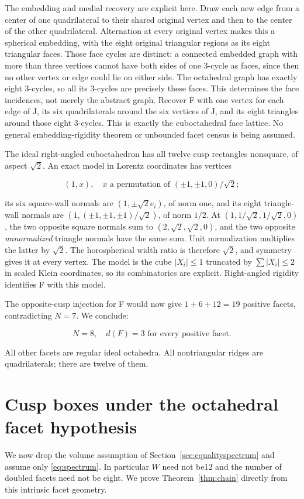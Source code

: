 \documentclass[11pt]{article}
\theoremstyle{remark}
\begin{document}
The embedding and medial recovery are explicit here. Draw each new edge from a center of one quadrilateral to their shared original vertex and then to the center of the other quadrilateral. Alternation at every original vertex makes this a spherical embedding, with the eight original triangular regions as its eight triangular faces. Those face cycles are distinct: a connected embedded graph with more than three vertices cannot have both sides of one $3$-cycle as faces, since then no other vertex or edge could lie on either side. The octahedral graph has exactly eight 3-cycles, so all its 3-cycles are precisely these faces. This determines the face incidences, not merely the abstract graph. Recover F with one vertex for each edge of J, its six quadrilaterals around the six vertices of J, and its eight triangles around those eight 3-cycles. This is exactly the cuboctahedral face lattice. No general embedding-rigidity theorem or unbounded facet census is being assumed.

The ideal right-angled cuboctahedron has all twelve cusp rectangles nonsquare, of aspect \(\sqrt2\). An exact model in Lorentz coordinates has vertices

\[
 (1,x),\quad x\text{ a permutation of }(\pm1,\pm1,0)/\sqrt2;
\]

its six square-wall normals are \((1,\pm\sqrt2 e_i)\), of norm one, and its eight triangle-wall normals are \((1,(\pm1,\pm1,\pm1)/\sqrt2)\), of norm \(1/2\). At \((1,1/\sqrt2,1/\sqrt2,0)\), the two opposite square normals sum to \((2,\sqrt2,\sqrt2,0)\), and the two opposite \emph{unnormalized} triangle normals have the same sum. Unit normalization multiplies the latter by \(\sqrt2\). The horospherical width ratio is therefore \(\sqrt2\), and symmetry gives it at every vertex. The model is the cube \(|X_i|\le1\) truncated by \(\sum|X_i|\le2\) in scaled Klein coordinates, so its combinatorics are explicit. Right-angled rigidity identifies F with this model.

The opposite-cusp injection for F would now give \(1+6+12=19\) positive facets, contradicting \(N=7\). We conclude:

\[
 \boxed{N=8,\quad d(F)=3\text{ for every positive facet}.}
\]

All other facets are regular ideal octahedra. All nontriangular ridges are quadrilaterals; there are twelve of them.

\section{Cusp boxes under the octahedral facet hypothesis}\label{sec:chainproof}
We now drop the volume assumption of Section~\ref{sec:equalityspectrum}
and assume only \eqref{eq:spectrum}. In particular $W$ need not be12
and the number of doubled facets need not be eight. We prove
Theorem~\ref{thm:chain} directly from this intrinsic facet geometry.
\end{document}
